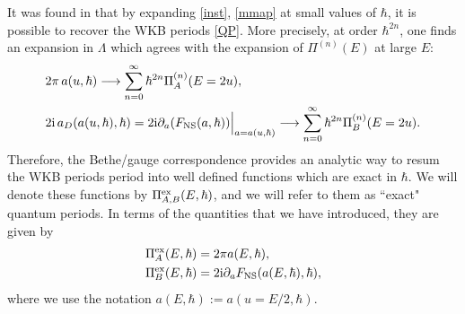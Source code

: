 \documentclass[a4paper,11pt]{article}
\theoremstyle{definition}
\newcommand{\ri}{{\rm i}}
\newcommand{\be}{\begin{equation}}
\newcommand{\ee}{\end{equation}}
\newcommand{\ba}{\begin{aligned}}
\newcommand{\ea}{\end{aligned}}
\begin{document}
 
It was found in \cite{mirmor} that by expanding \eqref{inst},
\eqref{mmap} at small values of $\hbar$, it is possible to recover the
WKB periods \eqref{QP}. More precisely, at order $\hbar^{2n}$, one
finds an expansion in $\Lambda$ which agrees with the expansion of
$\Pi^{(n)}(E)$ at large $E$: %
\begin{equation}
  \label{limit}
  \ba
  &2 \pi \, a(u,\hbar)\longrightarrow \sum_{n=0}^\infty \hbar^{2n}
    \Pi_A^{(n)} (E=2u), \\ 
  & 2 \ri \, a_D(a(u,\hbar), \hbar)= 2 \ri \partial_a( F_{\rm NS}(a,
  \hbar))\Big|_{a= a(u,\hbar)}\longrightarrow 
\sum_{n=0}^\infty \hbar^{2n} \Pi_B^{(n)} (E=2u).
  \ea
\end{equation}
%
Therefore, the Bethe/gauge correspondence provides an analytic way to
resum the WKB periods period into well defined functions which are
exact in $\hbar$. We will denote these functions by
$\Pi_{A, B}^{\rm ex}(E, \hbar)$, and we will refer to them as ``exact"
quantum periods. In terms of the quantities that we have introduced,
they are given by
%
\be\label{abpe}  
\ba
\Pi^{\rm ex}_A(E, \hbar)&=2 \pi a(E,\hbar), \\
\Pi_B^{\rm ex}(E, \hbar) &={ 2 \ri }\partial_{a}F_{\rm NS}(a (E, \hbar),\hbar),
\ea
\ee
%
where we use the notation $a(E,\hbar):=a(u=E/2,\hbar)$.
\end{document}
